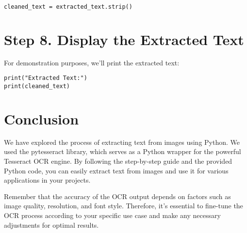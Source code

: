 \begin{lstlisting}
cleaned_text = extracted_text.strip()
\end{lstlisting}    


\section{Step 8. Display the Extracted Text}

For demonstration purposes, we’ll print the extracted text:

\begin{lstlisting}
print("Extracted Text:")
print(cleaned_text)
\end{lstlisting}    


\section{Conclusion}

We have explored the process of extracting text from images using Python. We used the pytesseract library, which serves as a Python wrapper for the powerful Tesseract OCR engine. By following the step-by-step guide and the provided Python code, you can easily extract text from images and use it for various applications in your projects.

Remember that the accuracy of the OCR output depends on factors such as image quality, resolution, and font style. Therefore, it’s essential to fine-tune the OCR process according to your specific use case and make any necessary adjustments for optimal results.


    
    
